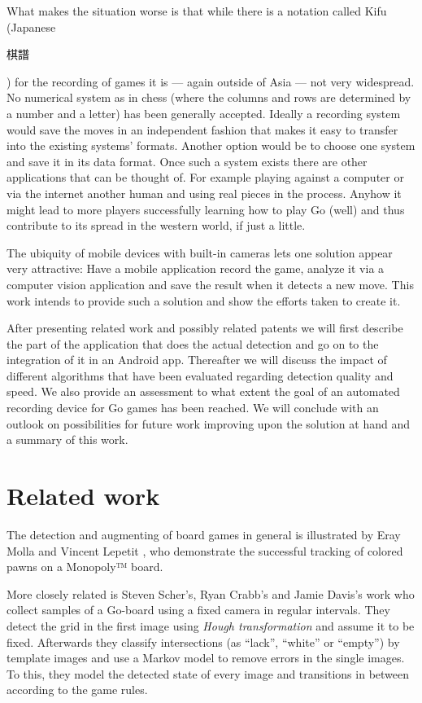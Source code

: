 	What makes the situation worse is that while there is a notation called Kifu (Japanese \begingroup\setmainfont{Droid Sans Japanese}\small\begin{CJK}{UTF8}{min}棋譜\end{CJK}\endgroup ) for the recording of games it is --- again outside of Asia --- not very widespread. No numerical system as in chess (where the columns and rows are determined by a number and a letter) has been generally accepted. Ideally a recording system would save the moves in an independent fashion that makes it easy to transfer into the existing systems' formats. Another option would be to choose one system and save it in its data format. Once such a system exists there are other applications that can be thought of. For example playing against a computer or via the internet another human and using real pieces in the process. Anyhow it might lead to more players successfully learning how to play Go (well) and thus contribute to its spread in the western world, if just a little.

	The ubiquity of mobile devices with built-in cameras lets one solution appear very attractive: Have a mobile application record the game, analyze it via a computer vision application and save the result when it detects a new move. This	work intends to provide such a solution and show the efforts taken to create it.

	After presenting related work and possibly related patents we will first describe the part of the application that does the actual detection and go on to the integration of it in an Android app. Thereafter we will discuss the impact of different algorithms that have been evaluated regarding detection quality and speed. We also provide an assessment to what extent the goal of an automated recording device for Go games has been reached. We will conclude with an outlook on possibilities for future work improving upon the solution at hand and a summary of this work.


	\section{Related work}
	\label{introduction-work}
	The detection and augmenting of board games in general is illustrated by Eray Molla and Vincent Lepetit \cite{molla2010augmented}, who demonstrate the successful tracking of colored pawns on a Monopoly™ board.

	More closely related is  Steven Scher's, Ryan Crabb's and Jamie Davis's work \cite{scher2008making} who collect samples of a Go-board using a fixed camera in regular intervals. They detect the grid in the first image using \emph{Hough transformation} and assume it to be fixed. Afterwards they classify intersections (as ``lack'', ``white'' or ``empty'') by template images and use a Markov model to remove errors in the single images. To this, they model the detected state of every image and transitions in between according to the game rules.

